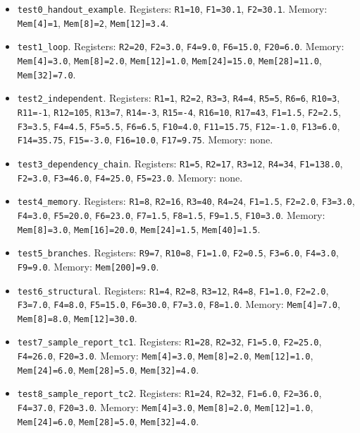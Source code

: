 {\raggedright\begin{itemize}\small
\item \texttt{test0\_handout\_example}. Registers: \texttt{R1=10}, \texttt{F1=30.1}, \texttt{F2=30.1}. Memory: \texttt{Mem[4]=1}, \texttt{Mem[8]=2}, \texttt{Mem[12]=3.4}.
\item \texttt{test1\_loop}. Registers: \texttt{R2=20}, \texttt{F2=3.0}, \texttt{F4=9.0}, \texttt{F6=15.0}, \texttt{F20=6.0}. Memory: \texttt{Mem[4]=3.0}, \texttt{Mem[8]=2.0}, \texttt{Mem[12]=1.0}, \texttt{Mem[24]=15.0}, \texttt{Mem[28]=11.0}, \texttt{Mem[32]=7.0}.
\item \texttt{test2\_independent}. Registers: \texttt{R1=1}, \texttt{R2=2}, \texttt{R3=3}, \texttt{R4=4}, \texttt{R5=5}, \texttt{R6=6}, \texttt{R10=3}, \texttt{R11=-1}, \texttt{R12=105}, \texttt{R13=7}, \texttt{R14=-3}, \texttt{R15=-4}, \texttt{R16=10}, \texttt{R17=43}, \texttt{F1=1.5}, \texttt{F2=2.5}, \texttt{F3=3.5}, \texttt{F4=4.5}, \texttt{F5=5.5}, \texttt{F6=6.5}, \texttt{F10=4.0}, \texttt{F11=15.75}, \texttt{F12=-1.0}, \texttt{F13=6.0}, \texttt{F14=35.75}, \texttt{F15=-3.0}, \texttt{F16=10.0}, \texttt{F17=9.75}. Memory: none.
\item \texttt{test3\_dependency\_chain}. Registers: \texttt{R1=5}, \texttt{R2=17}, \texttt{R3=12}, \texttt{R4=34}, \texttt{F1=138.0}, \texttt{F2=3.0}, \texttt{F3=46.0}, \texttt{F4=25.0}, \texttt{F5=23.0}. Memory: none.
\item \texttt{test4\_memory}. Registers: \texttt{R1=8}, \texttt{R2=16}, \texttt{R3=40}, \texttt{R4=24}, \texttt{F1=1.5}, \texttt{F2=2.0}, \texttt{F3=3.0}, \texttt{F4=3.0}, \texttt{F5=20.0}, \texttt{F6=23.0}, \texttt{F7=1.5}, \texttt{F8=1.5}, \texttt{F9=1.5}, \texttt{F10=3.0}. Memory: \texttt{Mem[8]=3.0}, \texttt{Mem[16]=20.0}, \texttt{Mem[24]=1.5}, \texttt{Mem[40]=1.5}.
\item \texttt{test5\_branches}. Registers: \texttt{R9=7}, \texttt{R10=8}, \texttt{F1=1.0}, \texttt{F2=0.5}, \texttt{F3=6.0}, \texttt{F4=3.0}, \texttt{F9=9.0}. Memory: \texttt{Mem[200]=9.0}.
\item \texttt{test6\_structural}. Registers: \texttt{R1=4}, \texttt{R2=8}, \texttt{R3=12}, \texttt{R4=8}, \texttt{F1=1.0}, \texttt{F2=2.0}, \texttt{F3=7.0}, \texttt{F4=8.0}, \texttt{F5=15.0}, \texttt{F6=30.0}, \texttt{F7=3.0}, \texttt{F8=1.0}. Memory: \texttt{Mem[4]=7.0}, \texttt{Mem[8]=8.0}, \texttt{Mem[12]=30.0}.
\item \texttt{test7\_sample\_report\_tc1}. Registers: \texttt{R1=28}, \texttt{R2=32}, \texttt{F1=5.0}, \texttt{F2=25.0}, \texttt{F4=26.0}, \texttt{F20=3.0}. Memory: \texttt{Mem[4]=3.0}, \texttt{Mem[8]=2.0}, \texttt{Mem[12]=1.0}, \texttt{Mem[24]=6.0}, \texttt{Mem[28]=5.0}, \texttt{Mem[32]=4.0}.
\item \texttt{test8\_sample\_report\_tc2}. Registers: \texttt{R1=24}, \texttt{R2=32}, \texttt{F1=6.0}, \texttt{F2=36.0}, \texttt{F4=37.0}, \texttt{F20=3.0}. Memory: \texttt{Mem[4]=3.0}, \texttt{Mem[8]=2.0}, \texttt{Mem[12]=1.0}, \texttt{Mem[24]=6.0}, \texttt{Mem[28]=5.0}, \texttt{Mem[32]=4.0}.
\end{itemize}}
